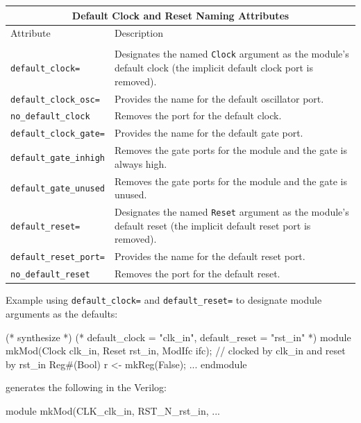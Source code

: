 \documentclass[twoside,letterpaper]{article}
\newenvironment{libverbatim}
  {\vspace*{-1.0em}
   \verbatim}
  {\endverbatim
  }
\newcommand{\te}[1]{\texttt{#1}}
\begin{document}
\begin{center}
\begin{tabular}{|p{2.0 in}|p{3.6 in}|}
\hline
\multicolumn{2}{|c|}{Default Clock and Reset Naming Attributes}\\
\hline
Attribute&Description\\
&\\
\hline
\hline
\te{default\_clock=} & Designates the named \te{Clock} argument
as the module's default clock (the implicit default clock port is
removed). \\
\hline
\te{default\_clock\_osc=} & Provides the  name
for  the default oscillator port. \\
\hline
\te{no\_default\_clock}& Removes the port for the default clock. \\
\hline
\te{default\_clock\_gate=}  &Provides the  name
for the default gate port.\\
\hline
 \te{default\_gate\_inhigh}  & Removes the gate ports for the module
 and the gate is always high. \\
 \hline
 \te{default\_gate\_unused}  & Removes the gate ports for the module
 and the gate is unused. \\
\hline
\te{default\_reset=} & Designates the named \te{Reset} argument
as the module's default reset (the implicit default reset port is
removed). \\
\hline
\te{default\_reset\_port=}& Provides the   name
for the default reset port. \\
\hline
\te{no\_default\_reset}&Removes the port for the default reset.\\
\hline
\end{tabular}
\end{center}

Example using \te{default\_clock=} and \te{default\_reset=} to designate
module arguments as the defaults:

\begin{libverbatim}
(* synthesize *)
(* default_clock = "clk_in", default_reset = "rst_in" *)
module mkMod(Clock clk_in, Reset rst_in, ModIfc ifc);
   // clocked by clk_in and reset by rst_in
   Reg#(Bool) r <- mkReg(False);
   ...
endmodule
\end{libverbatim}

generates the following in the Verilog:

\begin{libverbatim}
module mkMod(CLK_clk_in, RST_N_rst_in, ...
\end{libverbatim}
\end{document}

